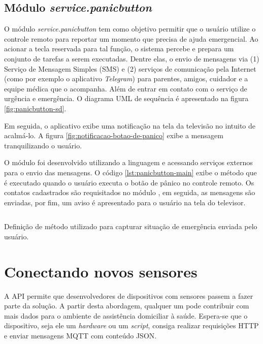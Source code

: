 \subsection{Módulo \textit{service.panicbutton}}\label{subsubsec:panicbutton}

O módulo \textit{service.panicbutton} tem como objetivo permitir que o usuário
utilize o controle remoto para reportar um momento que precisa de ajuda 
emergencial. Ao acionar a tecla reservada para tal função, o sistema percebe e
prepara um conjunto de tarefas a serem executadas. Dentre elas, o envio de 
mensagens via (1) Serviço de Mensagem Simples (SMS) e (2) serviços de comunicação
pela Internet (como por exemplo o aplicativo \textit{Telegram}) para parentes, 
amigos, cuidador e a equipe médica que o acompanha. Além de entrar em contato
com o serviço de urgência e emergência. O diagrama UML de sequência é apresentado
na figura \ref{fig:panicbutton-sd}.


Em seguida, o aplicativo exibe uma notificação na tela da televisão no intuito
de acalmá-lo. A figura \ref{fig:notificacao-botao-de-panico} exibe a mensagem 
tranquilizando o usuário.

O módulo foi desenvolvido utilizando a linguagem \python[] e acessando serviços
externos para o envio das mensagens. O código \ref{lst:panicbutton-main} exibe
o método que é executado quando o usuário executa o botão de pânico no controle
remoto. Os contatos cadastrados são requisitados no módulo \web, em seguida, as
mensagens são enviadas, por fim, um aviso é apresentado para o usuário na tela
do televisor.

\begin{listing}[ht!]
\inputminted{python}{codigos/panicbutton-main.py}
\caption{Definição de método utilizado para capturar situação de emergência enviada
pelo usuário.}
\label{lst:panicbutton-main}
\end{listing}

\section{Conectando novos sensores} \label{sec:conectando-novos-sensores}

A API permite que desenvolvedores de dispositivos com sensores passem a fazer
parte da solução. A partir desta abordagem, qualquer um pode contribuir  com
mais dados para o ambiente de assistência domiciliar à saúde. Espera-se que o
dispositivo, seja ele um \textit{hardware} ou um \textit{script}, consiga
realizar requisições HTTP e enviar mensagens MQTT com conteúdo JSON.

